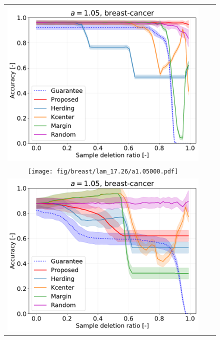 \begin{figure}[H]
\begin{tabular}{ccc}
	\\
	\begin{minipage}[b]{0.3\hsize}\centering {\small Dataset: breast-cancer, $\lambda=\lambda_\mathrm{best}$}\\\includegraphics[width=0.8\hsize]{fig/breast/lam_10.0/a1.05000.pdf}\end{minipage}
	&
	\begin{minipage}[b]{0.3\hsize}\centering {\small Dataset: breast-cancer, $\lambda=n \cdot 10^{-1.5}$}\\\texttt{[image: fig/breast/lam\_17.26/a1.05000.pdf]}\end{minipage}
	&
	\begin{minipage}[b]{0.3\hsize}\centering {\small Dataset: breast-cancer, $\lambda=n$}\\\includegraphics[width=0.8\hsize]{fig/breast/lam_546/a1.05000.pdf}\end{minipage}
	\\

\end{tabular}
\end{figure}
